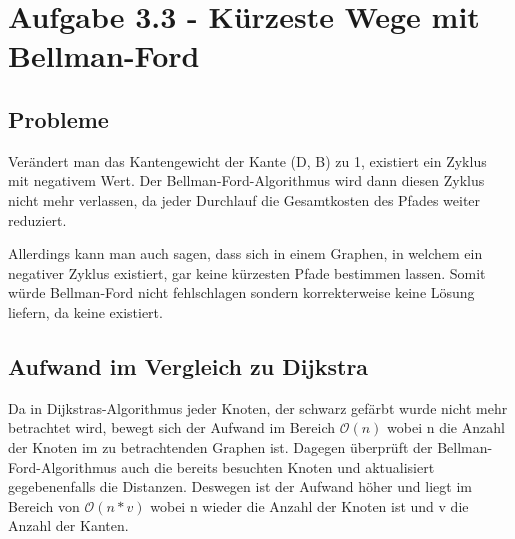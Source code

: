 \documentclass[11pt, oneside]{article}   	%
\begin{document}
\section*{Aufgabe 3.3 - Kürzeste Wege mit Bellman-Ford}

\subsection*{Probleme}
Verändert man das Kantengewicht der Kante (D, B) zu 1, existiert ein Zyklus mit negativem Wert. Der Bellman-Ford-Algorithmus wird dann diesen Zyklus nicht mehr verlassen, da jeder Durchlauf die Gesamtkosten des Pfades weiter reduziert.

Allerdings kann man auch sagen, dass sich in einem Graphen, in welchem ein negativer Zyklus existiert, gar keine kürzesten Pfade bestimmen lassen. Somit würde Bellman-Ford nicht fehlschlagen sondern korrekterweise keine Lösung liefern, da keine existiert.

\subsection*{Aufwand im Vergleich zu Dijkstra}
Da in Dijkstras-Algorithmus jeder Knoten, der schwarz gefärbt wurde nicht mehr betrachtet wird, bewegt sich der Aufwand im Bereich $ \mathcal{O} (n)$ wobei n die Anzahl der Knoten im zu betrachtenden Graphen ist.
Dagegen überprüft der Bellman-Ford-Algorithmus auch die bereits besuchten Knoten und aktualisiert gegebenenfalls die Distanzen. Deswegen ist der Aufwand höher und liegt im Bereich von $ \mathcal{O} (n*v)$ wobei n wieder die Anzahl der Knoten ist und v die Anzahl der Kanten.
\end{document}
